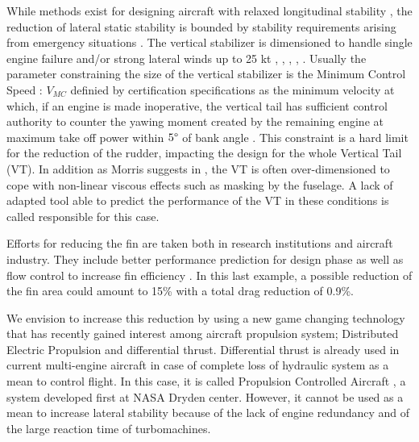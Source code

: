While methods exist for designing aircraft with relaxed longitudinal stability \cite{CosenzaHandlingQualities}, the reduction of lateral static stability is bounded by stability requirements arising from emergency situations . The vertical stabilizer is dimensioned to handle single engine failure and/or strong lateral winds up to 25 kt \cite{FeuersangerReducedStability}, \cite{AFC_NASA_report_Mooney}, \cite{NicolosiInvestigationVertical}, \cite{CS25}, \cite{MorrisFlDynCstinMDO}. Usually the parameter constraining the size of the vertical stabilizer is the Minimum Control Speed : $V_{MC}$ definied by certification specifications as the minimum velocity at which, if an engine is made inoperative, the vertical tail has sufficient control authority to counter the yawing moment created by the remaining engine at maximum take off power within $5\SIUnitSymbolDegree$ of bank angle \cite{CS25}. This constraint is a hard limit for the reduction of the rudder, impacting the design for the whole Vertical Tail (VT). In addition as Morris suggests in \cite{MorrisFlDynCstinMDO}, the VT is often over-dimensioned to cope with non-linear viscous effects such as masking by the fuselage. A lack of adapted tool able to predict the performance of the VT in these conditions is called responsible for this case.

Efforts for reducing the fin are taken both in research institutions and aircraft industry. They include better performance prediction for design phase \cite{dellavecchia} as well as flow control to increase fin efficiency \cite{InnovativeFlow_Lin}. In this last example, a possible reduction of the fin area could amount to 15\% with a total drag reduction of 0.9\%.

We envision to increase this reduction by using a new game changing technology that has recently gained interest among aircraft propulsion system; Distributed Electric Propulsion and differential thrust. Differential thrust is already used in current multi-engine aircraft in case of complete loss of hydraulic system as a mean to control flight. In this case, it is called Propulsion Controlled Aircraft \cite{TouchdownPCA}, a system developed first at NASA Dryden center. However, it cannot be used as a mean to increase lateral stability because of the lack of engine redundancy and of the large reaction time of turbomachines.

